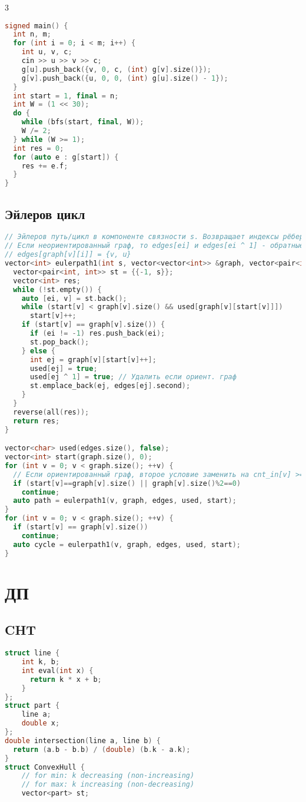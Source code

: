 \documentclass[9pt,a4paper,landscape,twosided]{extarticle}
\begin{document}
\begin{multicols*}{3}
\begin{lstlisting}[language=C++]
signed main() {
  int n, m;
  for (int i = 0; i < m; i++) {
    int u, v, c;
    cin >> u >> v >> c;
    g[u].push_back({v, 0, c, (int) g[v].size()});
    g[v].push_back({u, 0, 0, (int) g[u].size() - 1});
  }
  int start = 1, final = n;
  int W = (1 << 30);
  do {
    while (bfs(start, final, W));
    W /= 2;
  } while (W >= 1);
  int res = 0;
  for (auto e : g[start]) {
    res += e.f;
  }
}
\end{lstlisting}

\subsection{Эйлеров цикл}
\begin{lstlisting}[language=C++]
// Эйлеров путь/цикл в компоненте связности s. Возвращает индексы рёбер. Если пути/цикла нет, то алгос найдёт фигню.
// Если неориентированный граф, то edges[ei] и edges[ei ^ 1] - обратные друг к другу рёбра.
// edges[graph[v][i]] = {v, u}
vector<int> eulerpath1(int s, vector<vector<int>> &graph, vector<pair<int, int>> &edges, vector<char> &used, vector<int> &start) {
  vector<pair<int, int>> st = {{-1, s}};
  vector<int> res;
  while (!st.empty()) {
    auto [ei, v] = st.back();
    while (start[v] < graph[v].size() && used[graph[v][start[v]]])
      start[v]++;
    if (start[v] == graph[v].size()) {
      if (ei != -1) res.push_back(ei);
      st.pop_back();
    } else {
      int ej = graph[v][start[v]++];
      used[ej] = true;
      used[ej ^ 1] = true; // Удалить если ориент. граф
      st.emplace_back(ej, edges[ej].second);
    }
  }
  reverse(all(res));
  return res;
}

vector<char> used(edges.size(), false);
vector<int> start(graph.size(), 0);
for (int v = 0; v < graph.size(); ++v) {
  // Если ориентированный граф, второе условие заменить на cnt_in[v] >= cnt_out[v]
  if (start[v]==graph[v].size() || graph[v].size()%2==0)
    continue;
  auto path = eulerpath1(v, graph, edges, used, start);
}
for (int v = 0; v < graph.size(); ++v) {
  if (start[v] == graph[v].size())
    continue;
  auto cycle = eulerpath1(v, graph, edges, used, start);
}

\end{lstlisting}

\section{ДП}

\subsection{CHT}
\begin{lstlisting}[language=C++]
struct line {
    int k, b;
    int eval(int x) {
      return k * x + b;
    }
};
struct part {
    line a;
    double x;
};
double intersection(line a, line b) {
  return (a.b - b.b) / (double) (b.k - a.k);
}
struct ConvexHull {
    // for min: k decreasing (non-increasing)
    // for max: k increasing (non-decreasing)
    vector<part> st;


\end{lstlisting}
\end{multicols*}
\end{document}
